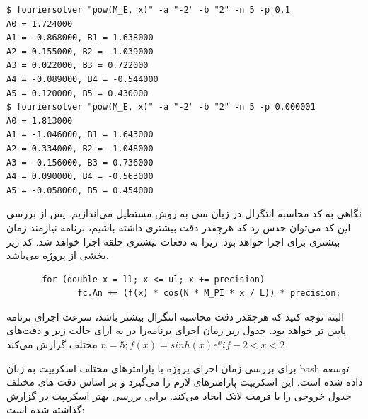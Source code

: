 \documentclass[a4paper]{report}
\begin{document}
\begin{latin}
\begin{verbatim}
$ fouriersolver "pow(M_E, x)" -a "-2" -b "2" -n 5 -p 0.1
A0 = 1.724000
A1 = -0.868000, B1 = 1.638000
A2 = 0.155000, B2 = -1.039000
A3 = 0.022000, B3 = 0.722000
A4 = -0.089000, B4 = -0.544000
A5 = 0.120000, B5 = 0.430000
$ fouriersolver "pow(M_E, x)" -a "-2" -b "2" -n 5 -p 0.000001
A0 = 1.813000
A1 = -1.046000, B1 = 1.643000
A2 = 0.334000, B2 = -1.048000
A3 = -0.156000, B3 = 0.736000
A4 = 0.090000, B4 = -0.563000
A5 = -0.058000, B5 = 0.454000
\end{verbatim}
\end{latin}

نگاهی به کد محاسبه انتگرال در زبان سی به روش مستطیل می‌اندازیم. پس از بررسی این کد می‌توان حدس زد که هرچقدر دقت بیشتری
داشته باشیم، برنامه نیازمند زمان بیشتری برای اجرا خواهد بود. زیرا به دفعات بیشتری حلقه اجرا خواهد شد. کد زیر بخشی از پروژه می‌باشد.
\begin{latin}
\begin{verbatim}
       for (double x = ll; x <= ul; x += precision)
              fc.An += (f(x) * cos(N * M_PI * x / L)) * precision;
\end{verbatim}
\end{latin}

البته توجه کنید که هرچقدر دقت محاسبه انتگرال بیشتر باشد، سرعت اجرای برنامه پایین تر خواهد بود. جدول زیر زمان اجرای
برنامه‌را در به ازای حالت زیر و دقت‌های مختلف گزارش می‌کند
$n=5; f(x) = sinh(x)e^x if -2 < x < 2$

برای بررسی زمان اجرای پروژه با پارامترهای مختلف اسکریپت  به زبان bash توسعه داده شده است.
این اسکریپت پارامترهای لازم را می‌گیرد و بر اساس دقت های مختلف جدول خروجی را با فرمت لاتک ایجاد می‌کند.
برایی بررسی بهتر اسکریپت در گزارش گذاشته شده است:
\end{document}
